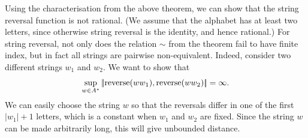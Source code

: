 \begin{myexample}
   \label{ex:string-reversal-not-rational} Using the characterisation from the above theorem, we can show that the string reversal function is not rational. (We assume that the alphabet has at least two letters, since otherwise string reversal is the identity, and hence rational.) For string reversal, not only does the relation $\sim$ from the theorem fail to have finite index, but in fact all strings are pairwise non-equivalent. Indeed, consider two different strings $w_1$ and $w_2$. We want to show that 
\begin{align*}
\sup_{w \in A^*} |\!| \text{reverse}(ww_1), \text{reverse}(ww_2) |\!| = \infty.
\end{align*}
We can easily choose the string $w$ so that the reversals differ in one of the first $|w_1|+1$ letters, which is a constant when $w_1$ and $w_2$ are fixed. Since the string $w$ can be made arbitrarily long, this will give unbounded distance.
\end{myexample}


\exerciseheader


